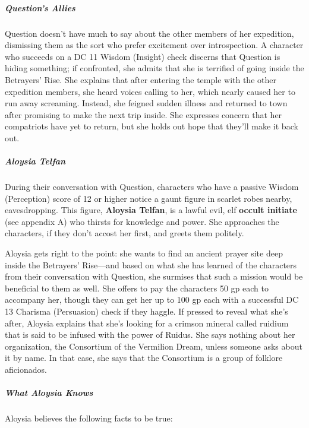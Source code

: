 \documentclass[10pt,a4paper,twoside,bg=print,twocolumn,openany,nodeprecatedcode]{dndbook}
\begin{document}
\subparagraph{Question's Allies}
Question doesn't have much to say about the other members of her expedition, dismissing them as the sort who prefer excitement over introspection. A character who succeeds on a DC 11 Wisdom (Insight) check discerns that Question is hiding something; if confronted, she admits that she is terrified of going inside the Betrayers' Rise. She explains that after entering the temple with the other expedition members, she heard voices calling to her, which nearly caused her to run away screaming. Instead, she feigned sudden illness and returned to town after promising to make the next trip inside. She expresses concern that her compatriots have yet to return, but she holds out hope that they'll make it back out.

\subparagraph{Aloysia Telfan}
During their conversation with Question, characters who have a passive Wisdom (Perception) score of 12 or higher notice a gaunt figure in scarlet robes nearby, eavesdropping. This figure, \textbf{Aloysia Telfan}, is a lawful evil, elf \textbf{occult initiate} (see appendix A) who thirsts for knowledge and power. She approaches the characters, if they don't accost her first, and greets them politely.

Aloysia gets right to the point: she wants to find an ancient prayer site deep inside the Betrayers' Rise—and based on what she has learned of the characters from their conversation with Question, she surmises that such a mission would be beneficial to them as well. She offers to pay the characters 50 gp each to accompany her, though they can get her up to 100 gp each with a successful DC 13 Charisma (Persuasion) check if they haggle. If pressed to reveal what she's after, Aloysia explains that she's looking for a crimson mineral called ruidium that is said to be infused with the power of Ruidus. She says nothing about her organization, the Consortium of the Vermilion Dream, unless someone asks about it by name. In that case, she says that the Consortium is a group of folklore aficionados.

\subparagraph{What Aloysia Knows}
Aloysia believes the following facts to be true:
\end{document}
